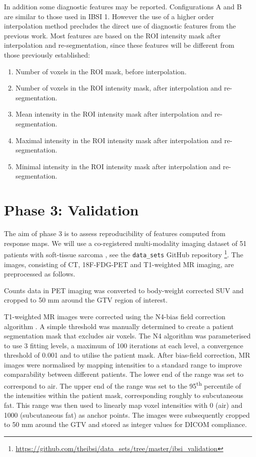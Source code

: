 \documentclass[fleqn,a4paper,oneside,openany]{book}
\renewcommand{\marginnote}[2][]{}
\begin{document}
In addition some diagnostic features may be reported. Configurations A and B are similar to those used in IBSI 1. However the use of a higher order interpolation method precludes the direct use of diagnostic features from the previous work. Most features are based on the ROI intensity mask after interpolation and re-segmentation, since these features will be different from those previously established:
\begin{enumerate}
    \item Number of voxels in the ROI mask, before interpolation.
    \item Number of voxels in the ROI intensity mask, after interpolation and re-segmentation.
    \item Mean intensity in the ROI intensity mask after interpolation and re-segmentation.
    \item Maximal intensity in the ROI intensity mask after interpolation and re-segmentation.
    \item Minimal intensity in the ROI intensity mask after interpolation and re-segmentation.
\end{enumerate}

\section{Phase 3: Validation}\label{sec:validationPhase}
\marginnote{\footnotesize v6: Introduced section on the validation phase. v7 updated configurations}
The aim of phase 3 is to assess reproducibility of features computed from response maps. We will use a co-registered multi-modality imaging dataset of 51 patients with soft-tissue sarcoma \cite{Vallieres2015-hv,Vallieres2015-tf}, see the \texttt{data\_sets} GitHub repository \footnote{\url{https://github.com/theibsi/data_sets/tree/master/ibsi_validation}}. The images, consisting of CT, 18F-FDG-PET and T1-weighted MR imaging, are preprocessed as follows.

Counts data in PET imaging was converted to body-weight corrected SUV and cropped to 50 mm around the GTV region of interest.

T1-weighted MR images were corrected using the N4-bias field correction algorithm \cite{Tustison2010-zb}. A simple threshold was manually determined to create a patient segmentation mask that excludes air voxels. The N4 algorithm was parameterised to use 3 fitting levels, a maximum of 100 iterations at each level, a convergence threshold of 0.001 and to utilise the patient mask. After bias-field correction, MR images were normalised by mapping intensities to a standard range to improve comparability between different patients. The lower end of the range was set to correspond to air. The upper end of the range was set to the 95\textsuperscript{th} percentile of the intensities within the patient mask, corresponding roughly to subcutaneous fat. This range was then used to linearly map voxel intensities with 0 (air) and 1000 (subcutaneous fat) as anchor points. The images were subsequently cropped to 50 mm around the GTV and stored as integer values for DICOM compliance.
\end{document}
